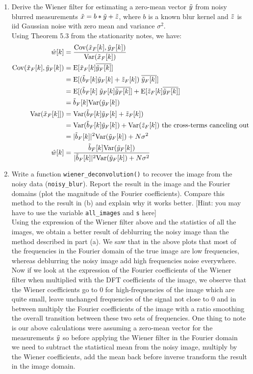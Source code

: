 \documentclass[12pt,twoside]{article}
\begin{document}
\begin{enumerate}
\begin{enumerate}
  \item Derive the Wiener filter for estimating a zero-mean vector $\tilde{  y }$ from noisy blurred measurements $\tilde{  x } = b \ast \tilde{  y } + \tilde{ z }$, where $b$ is a known blur kernel and $\tilde{ z }$ is iid Gaussian noise with zero mean and variance $\sigma^2$. \\
  Using Theorem 5.3 from the stationarity notes, we have:
  \begin{align*}
  	\hat{w}[k]					&= 	\frac{\mathrm{Cov}(\tilde{  x }_F[k], \tilde{  y }_F[k])} {\mathrm{Var}(\tilde{  x }_F[k])} \\
	\mathrm{Cov}(\tilde{  x }_F[k], \tilde{  y }_F[k])		&=	\mathrm{E}[\tilde{  x }_F[k] \overline{\tilde{  y }_F[k]}] \\
							&=	\mathrm{E}[(\tilde{  b }_F[k] \tilde{  y }_F[k] + \tilde{ z }_F[k]) \; \overline{\tilde{  y }_F[k]}] \\
							&=	\mathrm{E}[(\tilde{  b }_F[k] \; \tilde{  y }_F[k]  \overline{\tilde{  y }_F[k]} ] + \mathrm{E}[ \tilde{ z }_F[k]  \overline{\tilde{  y }_F[k]}] \\
							&=	\tilde{  b }_F[k]  \mathrm{Var}(\tilde{  y }_F[k]) \\
	\mathrm{Var}(\tilde{  x }_F[k]])				&=	\mathrm{Var}(\tilde{  b }_F[k] \tilde{  y }_F[k] + \tilde{ z }_F[k])	\\
							&= 	\mathrm{Var}(\tilde{  b }_F[k] \tilde{  y }_F[k]) + \mathrm{Var}(\tilde{ z }_F[k]) \text{ the cross-terms canceling out}\\
							&=	|\tilde{  b }_F[k]|^2 \mathrm{Var}(\tilde{  y }_F[k]) + N \sigma^2	\\	
	\hat{w}[k]					&= 	\frac{\tilde{  b }_F[k]  \mathrm{Var}(\tilde{  y }_F[k])} {|\tilde{  b }_F[k]|^2 \mathrm{Var}(\tilde{  y }_F[k]) + N \sigma^2}		
  \end{align*}
  
  
  \item Write a function \texttt{wiener\_deconvolution()} to recover the image from the noisy data (\texttt{noisy\_blur}). Report the result in the image and the Fourier domains (plot the magnitude of the Fourier coefficients). Compare this method to the result in (b) and explain why it works better. [Hint: you may have to use the variable \texttt{all\_images} and \texttt{s} here]\\
  Using the expression of the Wiener filter above and the statistics of all the images, we obtain a better result of deblurring the noisy image than the method described in part (a).
  We saw that in the above plots that most of the frequencies in the Fourier domain of  the true image are low frequencies, whereas deblurring the noisy image add high frequencies noise everywhere.
  Now if we look at the expression of the Fourier coefficients of the Wiener filter when multiplied with the DFT coefficients of the image, we observe that the Wiener coefficients go to $0$ for high-frequencies of the image which are quite small, leave unchanged frequencies of the signal not close to $0$ and in between multiply the Fourier coefficients of the image with a ratio smoothing the overall transition between these two sets of frequencies. One thing to note is our above calculations were assuming  a zero-mean vector for the measurements $\tilde{  y }$ so before applying the Wiener filter in the Fourier domain we need to subtract the statistical mean from the noisy image, multiply by the Wiener coefficients, add the mean back before inverse transform the result in the image domain.
  

\end{enumerate}
\end{enumerate}
\end{document}

